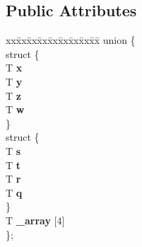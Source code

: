\subsection*{Public Attributes}
\begin{DoxyCompactItemize}
\item 
\hypertarget{classnv_1_1vec4_a0a4b52c987431d28ab17a5063882bf77}{}\label{classnv_1_1vec4_a0a4b52c987431d28ab17a5063882bf77} 
\begin{tabbing}
xx\=xx\=xx\=xx\=xx\=xx\=xx\=xx\=xx\=\kill
union \{\\
\hypertarget{unionnv_1_1vec4_1_1_0D18_a34f697e3853408dd0cd65df51105b36d}{}\label{unionnv_1_1vec4_1_1_0D18_a34f697e3853408dd0cd65df51105b36d} 
\>struct \{\\
\>\>T {\bfseries x}\\
\>\>T {\bfseries y}\\
\>\>T {\bfseries z}\\
\>\>T {\bfseries w}\\
\>\} \\
\hypertarget{unionnv_1_1vec4_1_1_0D18_a89abbd9128173c927bb3bb1a204f507c}{}\label{unionnv_1_1vec4_1_1_0D18_a89abbd9128173c927bb3bb1a204f507c} 
\>struct \{\\
\>\>T {\bfseries s}\\
\>\>T {\bfseries t}\\
\>\>T {\bfseries r}\\
\>\>T {\bfseries q}\\
\>\} \\
\>T {\bfseries \_array} \mbox{[}4\mbox{]}\\
\}; \\

\end{tabbing}\end{DoxyCompactItemize}
